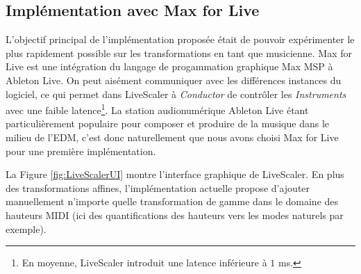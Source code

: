 \subsection{Implémentation avec Max for Live}

L'objectif principal de l'implémentation proposée était de pouvoir expérimenter le plus rapidement possible sur les transformations en tant que musicienne. Max for Live est une intégration du  langage de progammation graphique Max MSP à Ableton Live. On peut aisément communiquer avec les différences instances du logiciel, ce qui permet dans LiveScaler à \emph{Conductor} de contrôler les \emph{Instruments} avec une faible latence\footnote{En moyenne, LiveScaler introduit une latence inférieure à $1$ ms.}. La station audionumérique Ableton Live étant particulièrement populaire pour composer et produire de la musique dans le milieu de l'EDM, c'est donc naturellement que nous avons choisi Max for Live pour une première implémentation. 

La Figure \ref{fig:LiveScalerUI} montre l'interface graphique de LiveScaler. En plus des transformations affines, l'implémentation actuelle propose d'ajouter manuellement n'importe quelle transformation de gamme dans le domaine des hauteurs MIDI (ici des quantifications des hauteurs vers les modes naturels par exemple).






